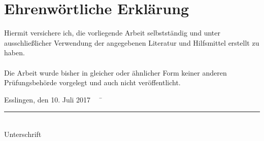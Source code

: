 \chapter*{Ehrenwörtliche Erklärung}
\thispagestyle{empty}
Hiermit versichere ich, die vorliegende Arbeit selbstständig und unter ausschließlicher Verwendung der angegebenen Literatur und Hilfsmittel erstellt zu haben.\\\\
Die Arbeit wurde bisher in gleicher oder ähnlicher Form keiner anderen Prüfungsbehörde vorgelegt und auch nicht veröffentlicht.\\
\begin{tabbing}
          Esslingen, den 10. Juli 2017 ~~	\= \rule{6cm}{0.3mm}\\
                                                                                     \> Unterschrift
\end{tabbing}



\frontmatter

\tableofcontents


\printglossary[type=\acronymtype, style=long, title=Abkürzungsverzeichnis]
\newpage


\mainmatter


















